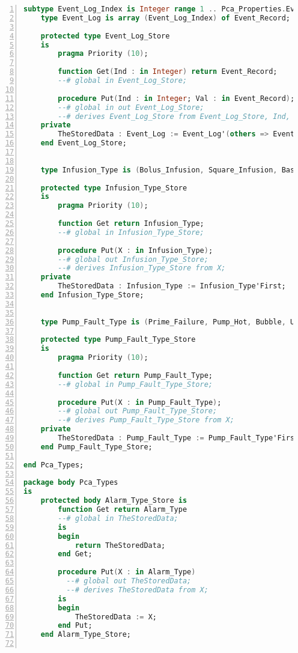 \begin{lstlisting}[language=ada, gobble=0, numbers=left, caption={\lstinline{Pca_Types} package}, label={listing:pca_generated:pca_types}]
    subtype Event_Log_Index is Integer range 1 .. Pca_Properties.Event_Log_Size;
    type Event_Log is array (Event_Log_Index) of Event_Record;

    protected type Event_Log_Store
    is
        pragma Priority (10);

        function Get(Ind : in Integer) return Event_Record;
        --# global in Event_Log_Store;

        procedure Put(Ind : in Integer; Val : in Event_Record);
        --# global in out Event_Log_Store;
        --# derives Event_Log_Store from Event_Log_Store, Ind, Val;
    private
        TheStoredData : Event_Log := Event_Log'(others => Event_Record'(Time => Bless_Types.Time'First));
    end Event_Log_Store;


    type Infusion_Type is (Bolus_Infusion, Square_Infusion, Basal_Infusion, KVO_Infusion);

    protected type Infusion_Type_Store
    is
        pragma Priority (10);

        function Get return Infusion_Type;
        --# global in Infusion_Type_Store;

        procedure Put(X : in Infusion_Type);
        --# global out Infusion_Type_Store;
        --# derives Infusion_Type_Store from X;
    private
        TheStoredData : Infusion_Type := Infusion_Type'First;
    end Infusion_Type_Store;


    type Pump_Fault_Type is (Prime_Failure, Pump_Hot, Bubble, Upstream_Occlusion_Fault, Downstream_Occlusion_Fault, Overinfusion, Underinfusion);

    protected type Pump_Fault_Type_Store
    is
        pragma Priority (10);

        function Get return Pump_Fault_Type;
        --# global in Pump_Fault_Type_Store;

        procedure Put(X : in Pump_Fault_Type);
        --# global out Pump_Fault_Type_Store;
        --# derives Pump_Fault_Type_Store from X;
    private
        TheStoredData : Pump_Fault_Type := Pump_Fault_Type'First;
    end Pump_Fault_Type_Store;

end Pca_Types;

package body Pca_Types
is
    protected body Alarm_Type_Store is
        function Get return Alarm_Type
        --# global in TheStoredData;
        is
        begin
            return TheStoredData;
        end Get;

        procedure Put(X : in Alarm_Type)
          --# global out TheStoredData;
          --# derives TheStoredData from X;
        is
        begin
            TheStoredData := X;
        end Put;
    end Alarm_Type_Store;


\end{lstlisting}
